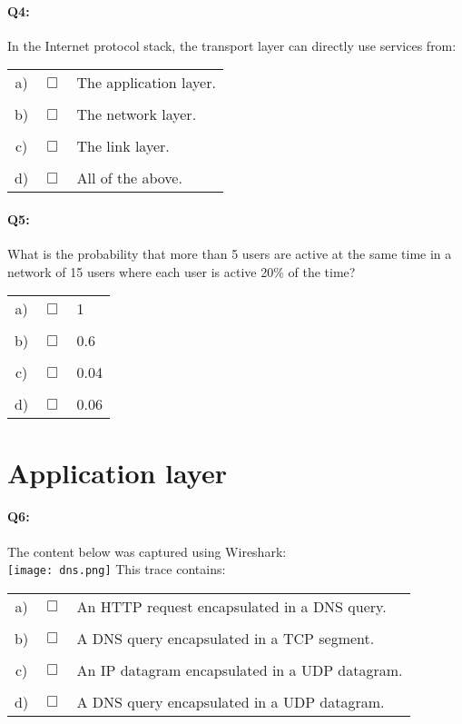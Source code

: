 \documentclass{llncs}
\begin{document}
\paragraph{\textbf{Q4:}} In the Internet protocol stack, the transport layer can directly use services from:\\

\begin{tabular}{ccl}
  a) & $\Box$ & The application layer.\\
  \\
  b) & $\Box$ & The network layer.\\
  \\
  c) & $\Box$ & The link layer.\\
  \\
  d) & $\Box$ & All of the above.
\end{tabular}

\paragraph{\textbf{Q5:}} What is the probability that more than 5 users are active at the same time in a network of 15 users where each user is active 20\% of the time?\\

\begin{tabular}{ccl}
  a) & $\Box$ & 1\\
  \\
  b) & $\Box$ & 0.6\\
  \\
  c) & $\Box$ & 0.04\\
  \\
  d) & $\Box$ & 0.06
\end{tabular}

\section*{Application layer}

\paragraph{\textbf{Q6:}}
The content below was captured using
Wireshark:\\
\texttt{[image: dns.png]}
This trace contains:\\

\begin{tabular}{ccl}
  a) & $\Box$ & An HTTP request encapsulated in a DNS query.\\
  \\
  b) & $\Box$ & A DNS query encapsulated in a TCP segment.\\
  \\
  c) & $\Box$ & An IP datagram encapsulated in a UDP datagram.\\
  \\
  d) & $\Box$ & A DNS query encapsulated in a UDP datagram.
\end{tabular}
\end{document}
